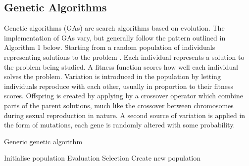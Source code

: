 
\subsection{Genetic Algorithms}
\newline
{}
\newline
Genetic algorithms (GAs) are search algorithms based on evolution. The implementation of GAs vary, but
generally follow the pattern outlined in Algorithm 1 below. Starting from a random population of individuals
representing solutions to the problem . Each individual represents a solution to the problem being
studied. A fitness function scores how well each individual solves the problem. Variation is introduced
in the population by letting individuals reproduce with each other, usually in proportion to their fitness
scores. Offspring is created by applying by a crossover operator which combine parts of the parent solutions,
much like the crossover between chromosomes during sexual reproduction in nature. A second source of variation
is applied in the form of mutations, each gene is randomly altered with some probability.


\begin{algorithm}[H]
    \caption{Generic genetic algorithm}
    \begin{algorithmic}

    \State Initialise population
        \State Evaluation 
        \State Selection  
        \State Create new population 
    \EndWhile
\EndProcedure

\end{algorithmic}
\end{algorithm}

